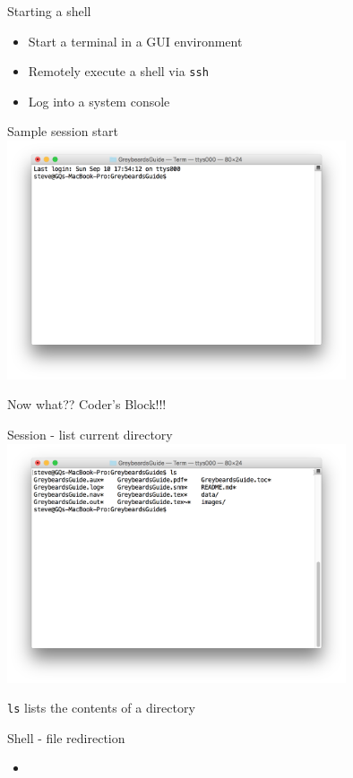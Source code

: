 \documentclass[t]{beamer}
\begin{document}
\begin{frame}{Starting a shell}
  \begin{itemize}
  \item Start a terminal in a GUI environment
  \item Remotely execute a shell via \texttt{ssh}
  \item Log into a system console
  \end{itemize}
  \note{}
\end{frame}

\begin{frame}{Sample session start}
  \includegraphics[width=10cm,scale=0.4]{images/newtty-1.png}

  Now what?? Coder's Block!!!
  \note{}
\end{frame}

\begin{frame}{Session - list current directory}
  \includegraphics[width=10cm,scale=0.4]{images/newtty-2.png}

  \texttt{ls} lists the contents of a directory
  \note{}
\end{frame}

\begin{frame}{Shell - file redirection}
  \begin{itemize}
  \item 
  \end{itemize}
  \note{
       }
\end{frame}
\end{document}
